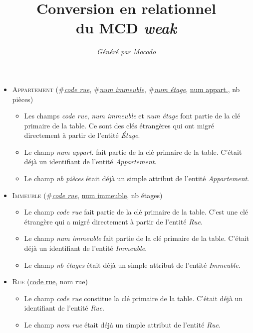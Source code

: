 \documentclass[a4paper]{article}
\title{Conversion en relationnel\\du MCD \emph{weak}}
\author{\emph{Généré par Mocodo}}
\newcommand{\relat}[1]{\textsc{#1}}
\newcommand{\attr}[1]{#1}
\newcommand{\prim}[1]{\uline{#1}}
\newcommand{\foreign}[1]{\#\textsl{#1}}
\begin{document}
\maketitle

\begin{itemize}
  \item \relat{Appartement} (\foreign{\prim{code rue}}, \foreign{\prim{num immeuble}}, \foreign{\prim{num étage}}, \prim{num appart.}, \attr{nb pièces})
  \begin{itemize}
    \item Les champs \emph{code rue}, \emph{num immeuble} et \emph{num étage} font partie de la clé primaire de la table. Ce sont des clés étrangères qui ont migré directement à partir de l'entité \emph{Étage}.
    \item Le champ \emph{num appart.} fait partie de la clé primaire de la table. C'était déjà un identifiant de l'entité \emph{Appartement}.
    \item Le champ \emph{nb pièces} était déjà un simple attribut de l'entité \emph{Appartement}.
  \end{itemize}

  \item \relat{Immeuble} (\foreign{\prim{code rue}}, \prim{num immeuble}, \attr{nb étages})
  \begin{itemize}
    \item Le champ \emph{code rue} fait partie de la clé primaire de la table. C'est une clé étrangère qui a migré directement à partir de l'entité \emph{Rue}.
    \item Le champ \emph{num immeuble} fait partie de la clé primaire de la table. C'était déjà un identifiant de l'entité \emph{Immeuble}.
    \item Le champ \emph{nb étages} était déjà un simple attribut de l'entité \emph{Immeuble}.
  \end{itemize}

  \item \relat{Rue} (\prim{code rue}, \attr{nom rue})
  \begin{itemize}
    \item Le champ \emph{code rue} constitue la clé primaire de la table. C'était déjà un identifiant de l'entité \emph{Rue}.
    \item Le champ \emph{nom rue} était déjà un simple attribut de l'entité \emph{Rue}.
  \end{itemize}


\end{itemize}
\end{document}
